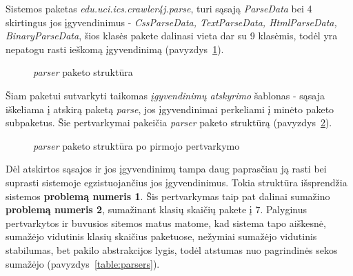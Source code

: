 Sistemos paketas \textit{edu.uci.ics.crawler4j.parse}, turi sąsają \textit{ParseData} bei 4 skirtingus jos įgyvendinimus - \textit{CssParseData, TextParseData, HtmlParseData, BinaryParseData},
šios klasės pakete dalinasi vieta dar su 9 klasėmis, todėl yra nepatogu rasti ieškomą įgyvendinimą (pavyzdys~\ref{fig:parse}).
\begin{figure}[H]
    \snugshade
    \endsnugshade
    \caption{\textit{parser} paketo struktūra}
    \label{fig:parse}
\end{figure}
Šiam paketui sutvarkyti taikomas \textit{įgyvendinimų atskyrimo} šablonas - sąsaja iškeliama į atskirą paketą \textit{parse}, jos įgyvendinimai perkeliami į minėto
paketo subpaketus.
Šie pertvarkymai pakeičia \textit{parser} paketo struktūrą (pavyzdys~\ref{fig:parser}).
\begin{figure}[H]
    \snugshade
    \endsnugshade
    \caption{\textit{parser} paketo struktūra po pirmojo pertvarkymo}
    \label{fig:parser}
\end{figure}
Dėl atskirtos sąsajos ir jos įgyvendinimų tampa daug paprasčiau ją rasti bei suprasti sistemoje egzistuojančius jos įgyvendinimus.
Tokia struktūra išsprendžia sistemos \textbf{problemą numeris 1}.
Šis pertvarkymas taip pat dalinai sumažino \textbf{problemą numeris 2}, sumažinant klasių skaičių pakete į 7.
Palyginus pertvarkytos ir buvusios sitemos matus matome, kad sistema tapo aiškesnė, sumažėjo vidutinis klasių skaičius paketuose, nežymiai sumažėjo
vidutinis stabilumas, bet pakilo abstrakcijos lygis, todėl atstumas nuo pagrindinės sekos sumažėjo (pavyzdys~\ref{table:parsers}).

